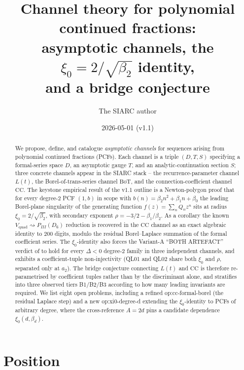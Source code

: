 \documentclass[11pt,reqno]{amsart}
\title[Channel theory for polynomial continued fractions]
{Channel theory for polynomial continued fractions:\\
asymptotic channels,
the $\xi_0 = 2/\sqrt{\beta_2}$ identity,\\
and a bridge conjecture}
\author{The SIARC author}
\date{2026-05-01 (v1.1)}
\theoremstyle{plain}
\theoremstyle{definition}
\theoremstyle{remark}
\newcommand{\Lt}{L(t)}
\newcommand{\BoT}{\mathrm{BoT}}
\newcommand{\CC}{\mathrm{CC}}
\newcommand{\Vquad}{V_{\mathrm{quad}}}
\begin{document}
\maketitle

\begin{abstract}
We propose, define, and catalogue \emph{asymptotic channels}
for sequences arising from polynomial continued fractions
(PCFs). Each channel is a triple $(D, T, S)$ specifying a
formal-series space $D$, an asymptotic gauge $T$, and an
analytic-continuation section $S$; three concrete channels
appear in the SIARC stack -- the recurrence-parameter channel
$\Lt$, the Borel-of-trans-series channel $\BoT$, and the
connection-coefficient channel $\CC$. The keystone empirical
result of the v1.1 outline is a Newton-polygon proof
\cite{siarc_cc_pipeline_g} that for every degree-$2$ PCF
$(1, b)$ in scope with $b(n) = \beta_2 n^2 + \beta_1 n + \beta_0$
the leading Borel-plane singularity of the generating function
$f(z) = \sum_n Q_n z^n$ sits at radius
$\xi_0 = 2/\sqrt{\beta_2}$, with secondary exponent
$\rho = -3/2 - \beta_1/\beta_2$. As a corollary the known
$\Vquad \rightsquigarrow P_{III}(D_6)$ reduction is recovered
in the $\CC$ channel as an exact algebraic identity to
$200$ digits, modulo the residual Borel--Laplace summation of
the formal coefficient series. The $\xi_0$-identity also
forces the Variant-A ``BOTH ARTEFACT'' verdict of
\cite{siarc_borel_kscan} to hold for every $\Delta<0$
degree-$2$ family in three independent channels, and
exhibits a coefficient-tuple non-injectivity (QL01 and QL02
share both $\xi_0$ and $\rho$, separated only at $a_2$). The
bridge conjecture connecting $\Lt$ and $\CC$ is therefore
re-parametrised by coefficient tuples rather than by the
discriminant alone, and stratifies into three observed tiers
B1/B2/B3 according to how many leading invariants are required.
We list eight open problems, including a refined
\textsf{op:cc-formal-borel} (the residual Laplace step) and a
new \textsf{op:xi0-degree-d} extending the $\xi_0$-identity
to PCFs of arbitrary degree, where the cross-reference
$A = 2d$ \cite{siarc_pcf2_v11} pins a candidate dependence
$\xi_0(d, \beta_d)$.
\end{abstract}

\tableofcontents

\section{Position}
\label{sec:position}
\end{document}
